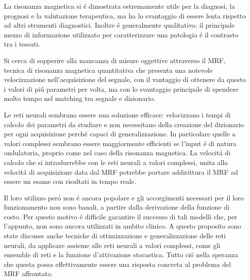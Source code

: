 \documentclass[a4paper,12pt]{report}
\begin{document}
 La risonanza magnetica si \'e dimostrata estremamente utile per la diagnosi, la prognosi e la valutazione terapeutica, ma ha lo svantaggio di essere lenta rispetto ad altri strumenti diagnostici. 
 Inoltre \'e generalmente qualitativa: il principale mezzo di informazione utilizzato per caratterizzare una patologia \'e il contrasto tra i tessuti.
 
 Si cerca di sopperire alla mancanza di misure oggettive attraverso il MRF, tecnica di risonanza magnetica quantitativa che presenta una notevole velocizzazione nell'acquisizione del segnale, con il vantaggio di ottenere da questo i valori di pi\'u  parametri per volta, ma con lo svantaggio principale di spendere molto tempo nel matching tra segnale e dizionario.
 
 Le reti neurali sembrano essere una soluzione efficace: velocizzano i tempi di calcolo dei parametri da studiare e non necessitano della creazione del dizionario per ogni acquisizione perch\'e capaci di generalizzazione. 
 In particolare quelle a valori complessi sembrano essere maggiormente efficienti se l'input \'e di natura ondulatoria, proprio come nel caso della risonanza magnetica.
 La velocit\'a di calcolo che si introdurrebbe con le reti neurali a valori complessi, unita alla velocit\'a di acquisizione data dal MRF potrebbe portare addirittura il MRF ad essere un esame con risultati in tempo reale.
 
 Il loro utilizzo per\'o non \'e ancora popolare e gli accorgimenti necessari per il loro funzionamento non sono banali, a partire dalla derivazione della funzione di costo.
 Per questo motivo \'e difficile garantire il successo di tali modelli che, per l'appunto, non sono ancora utilizzati in ambito clinico.
 A questo proposito sono state discusse anche tecniche di ottimizzazione e generalizzazione delle reti neurali, da applicare assieme alle reti neurali a valori complessi, come gli ensemble di reti e la funzione d'attivazione stocastica.
 Tutto ci\'o nella speranza che questa possa effettivamente essere una risposta concreta al problema del MRF affrontato. 
 
 
 
 
\end{document}
